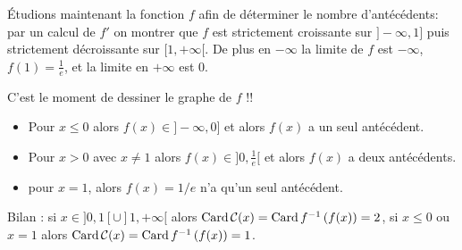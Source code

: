 {{\'Etudions maintenant la fonction $f$ afin de d\'eterminer le nombre d'ant\'ec\'edents:
par un calcul de $f'$ on montrer que $f$ est strictement croissante sur $]-\infty,1]$ puis
strictement d\'ecroissante sur $[1,+\infty[$. De plus en $-\infty$ la limite de $f$ est $-\infty$,
$f(1) = \frac 1e$, et la limite en $+\infty$ est $0$.

C'est le moment de dessiner le graphe de $f$ !!

   \begin{itemize}
\item Pour $x\leqslant 0$ alors $f(x) \in ]-\infty,0]$ et alors $f(x)$ a un seul ant\'ec\'edent.
\item Pour $x>0$ avec $x\neq 1$ alors $f(x) \in ]0,\frac 1e[$ et alors $f(x)$ a deux ant\'ec\'edents.
\item pour $x=1$, alors $f(x) = 1/e$ n'a qu'un seul antécédent.
   \end{itemize}
   
   Bilan : si $x \in {}]0,1[ \cup ]1,+\infty[$ alors $\text{Card\,} \mathcal{C}(x) = \text{Card\,} f^{-1}\left( f(x) \right) = 2$,
   si $x\leqslant 0$ ou $x=1$ alors $\text{Card\,} \mathcal{C}(x) = \text{Card\,} f^{-1}\left( f(x) \right) = 1$.
}
}
